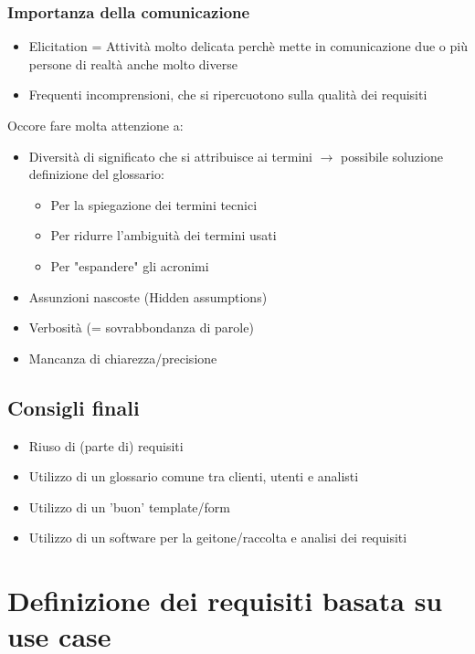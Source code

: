 \documentclass[12pt, a4paper]{report}
\begin{document}
\subsection{Importanza della comunicazione}
\begin{itemize}
    \item Elicitation = Attività molto delicata perchè mette in comunicazione due o più persone di realtà anche molto diverse
    \item Frequenti incomprensioni, che si ripercuotono sulla qualità dei requisiti
\end{itemize}
Occore fare molta attenzione a:
\begin{itemize}
    \item Diversità di significato che si attribuisce ai termini $\rightarrow$ possibile soluzione definizione del glossario: \begin{itemize}
        \item Per la spiegazione dei termini tecnici
        \item Per ridurre l'ambiguità dei termini usati
        \item Per "espandere" gli acronimi
    \end{itemize}
    \item Assunzioni nascoste (Hidden assumptions)
    \item Verbosità (= sovrabbondanza di parole)
    \item Mancanza di chiarezza/precisione
\end{itemize}
\section{Consigli finali}
\begin{itemize}
    \item Riuso di (parte di) requisiti
    \item Utilizzo di un glossario comune tra clienti, utenti e analisti
    \item Utilizzo di un 'buon' template/form
    \item Utilizzo di un software per la geitone/raccolta e analisi dei requisiti
\end{itemize}
\chapter{Definizione dei requisiti basata su use case}
\end{document}
